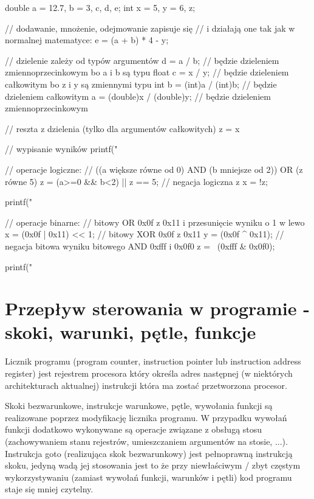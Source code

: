 \documentclass{pdfBooklets}
\begin{document}
\begin{CodeFrame*}[c]{}
double a = 12.7, b = 3, c, d, e;
int x = 5, y = 6, z;

// dodawanie, mnożenie, odejmowanie zapisuje się
// i działają one tak jak w normalnej matematyce:
e = (a + b) * 4 - y;

// dzielenie zależy od typów argumentów
d = a / b; // będzie dzieleniem zmiennoprzecinkowym bo a i b są typu float
c = x / y; // będzie dzieleniem całkowitym bo z i y są zmiennymi typu int
b = (int)a / (int)b; // będzie dzieleniem całkowitym
a = (double)x / (double)y; // będzie dzieleniem zmiennoprzecinkowym

// reszta z dzielenia (tylko dla argumentów całkowitych)
z = x %

// wypisanie wyników
printf("%

// operacje logiczne:
// ((a większe równe od 0) AND (b mniejsze od 2)) OR (z równe 5)
z = (a>=0 && b<2) || z == 5;
// negacja logiczna z
x = !z;

printf("%

// operacje binarne:
// bitowy OR 0x0f z 0x11 i przesunięcie wyniku o 1 w lewo
x = (0x0f | 0x11) << 1;
// bitowy XOR 0x0f z 0x11
y = (0x0f ^ 0x11);
// negacja bitowa wyniku bitowego AND 0xfff i 0x0f0
z = ~(0xfff & 0x0f0);

printf("%
\end{CodeFrame*}


\section{Przepływ sterowania w programie - skoki, warunki, pętle, funkcje}

Licznik programu (program counter, instruction pointer lub instruction address register) jest rejestrem procesora który określa adres następnej (w niektórych architekturach aktualnej) instrukcji która ma zostać przetworzona procesor.

Skoki bezwarunkowe, instrukcje warunkowe, pętle, wywołania funkcji są realizowane poprzez modyfikację licznika programu. W przypadku wywołań funkcji dodatkowo wykonywane są operacje związane z obsługą stosu (zachowywaniem stanu rejestrów, umieszczaniem argumentów na stosie, ...). Instrukcja goto (realizująca skok bezwarunkowy) jest pełnoprawną instrukcją skoku, jedyną wadą jej stosowania jest to że przy niewłaściwym / zbyt częstym wykorzystywaniu (zamiast wywołań funkcji, warunków i pętli) kod programu staje się mniej czytelny.
\end{document}
